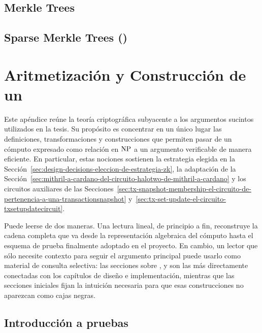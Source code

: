 \documentclass[11pt,a4paper,twoside]{tesis}
\begin{document}


\section{Merkle Trees}
\label{sec:primitivas-criptograficas-merkle-trees}



\section{Sparse Merkle Trees (\SMT)}
\label{sec:primitivas-criptograficas-sparse-merkle-trees-smt}




\chapter{Aritmetización y Construcción de un \SNARK}
\label{chap:aritmetizacion-y-construccion-de-un-snark}

Este apéndice reúne la teoría criptográfica subyacente a los argumentos sucintos utilizados en la tesis. Su propósito es concentrar en un único lugar las definiciones, transformaciones y construcciones que permiten pasar de un cómputo expresado como relación en $\mathrm{NP}$ a un argumento \zkSNARK verificable de manera eficiente. En particular, estas nociones sostienen la estrategia elegida en la Sección~\ref{sec:design-decisions-eleccion-de-estrategia-zk}, la adaptación \Onchain de la Sección~\ref{sec:mithril-a-cardano-del-circuito-halotwo-de-mithril-a-cardano} y los circuitos auxiliares de las Secciones~\ref{sec:tx-snapshot-membership-el-circuito-de-pertenencia-a-una-transactionsnapshot} y~\ref{sec:tx-set-update-el-circuito-txsetupdatecircuit}.

Puede leerse de dos maneras. Una lectura lineal, de principio a fin, reconstruye la cadena completa que va desde la representación algebraica del cómputo hasta el esquema de prueba finalmente adoptado en el proyecto. En cambio, un lector que sólo necesite contexto para seguir el argumento principal puede usarlo como material de consulta selectiva: las secciones sobre \QAP, \KZG y \Groth son las más directamente conectadas con los capítulos de diseño e implementación, mientras que las secciones iniciales fijan la intuición necesaria para que esas construcciones no aparezcan como cajas negras.

\section{Introducción a pruebas \ZK}
\label{sec:aritmetizacion-y-construccion-de-un-snark-introduccion-a-pruebas-zk}
\end{document}
